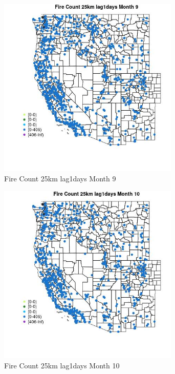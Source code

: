 \begin{figure} 
\centering  
\includegraphics[width=0.77\textwidth]{Code_Outputs/Report_ML_input_PM25_Step4_part_f_de_duplicated_aves_prioritize_24hr_obswNAs_MapObsMo9Fire_Count_25km_lag1days.jpg} 
\caption{\label{fig:Report_ML_input_PM25_Step4_part_f_de_duplicated_aves_prioritize_24hr_obswNAsMapObsMo9Fire_Count_25km_lag1days}Fire Count 25km lag1days Month 9} 
\end{figure} 
 

\clearpage 

\begin{figure} 
\centering  
\includegraphics[width=0.77\textwidth]{Code_Outputs/Report_ML_input_PM25_Step4_part_f_de_duplicated_aves_prioritize_24hr_obswNAs_MapObsMo10Fire_Count_25km_lag1days.jpg} 
\caption{\label{fig:Report_ML_input_PM25_Step4_part_f_de_duplicated_aves_prioritize_24hr_obswNAsMapObsMo10Fire_Count_25km_lag1days}Fire Count 25km lag1days Month 10} 
\end{figure} 
 

